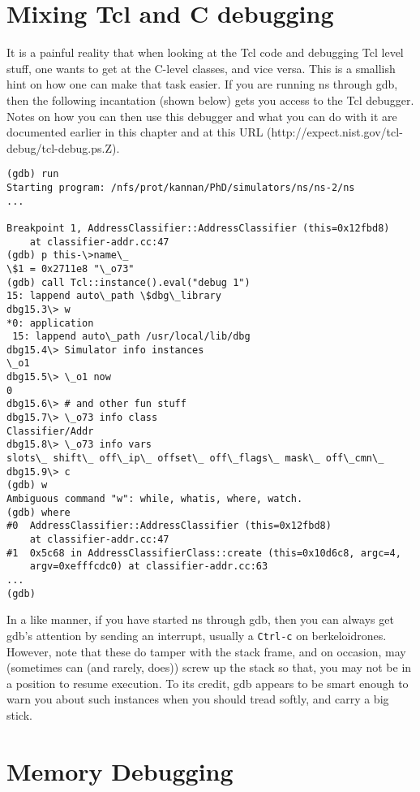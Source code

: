 \section{Mixing Tcl and C debugging}
\label{sec:mixdebug}

It is a painful reality that when looking at the Tcl code and debugging
Tcl level stuff, one wants to get at the C-level classes, and vice versa.
This is a smallish hint on how one can make that task easier. If you are
running ns through gdb, then the following incantation (shown below) gets
you access to the Tcl 
debugger. Notes on how you can then use this debugger and what you can do
with it are documented earlier in this chapter and at this URL
(http://expect.nist.gov/tcl-debug/tcl-debug.ps.Z).
\begin{verbatim} 
(gdb) run
Starting program: /nfs/prot/kannan/PhD/simulators/ns/ns-2/ns 
...

Breakpoint 1, AddressClassifier::AddressClassifier (this=0x12fbd8)
    at classifier-addr.cc:47
(gdb) p this-\>name\_
\$1 = 0x2711e8 "\_o73"
(gdb) call Tcl::instance().eval("debug 1")
15: lappend auto\_path \$dbg\_library
dbg15.3\> w
*0: application
 15: lappend auto\_path /usr/local/lib/dbg
dbg15.4\> Simulator info instances
\_o1
dbg15.5\> \_o1 now
0
dbg15.6\> # and other fun stuff
dbg15.7\> \_o73 info class
Classifier/Addr
dbg15.8\> \_o73 info vars
slots\_ shift\_ off\_ip\_ offset\_ off\_flags\_ mask\_ off\_cmn\_
dbg15.9\> c
(gdb) w
Ambiguous command "w": while, whatis, where, watch.
(gdb) where
#0  AddressClassifier::AddressClassifier (this=0x12fbd8)
    at classifier-addr.cc:47
#1  0x5c68 in AddressClassifierClass::create (this=0x10d6c8, argc=4, 
    argv=0xefffcdc0) at classifier-addr.cc:63
...
(gdb)
\end{verbatim}

In a like manner, if you have started ns through gdb, then you can always
get gdb's attention by sending an interrupt, usually a {\tt \<Ctrl-c\>}
on
berkeloidrones. However, note that these do tamper with the stack frame, and on occasion,
may (sometimes can (and rarely, does)) screw up the stack so that, you may
not be in a position to resume execution. To its credit, gdb appears to be
smart enough to warn you about such instances when you should tread
softly, and carry a big stick. 


\section{Memory Debugging}
\label{sec:memdebug}

